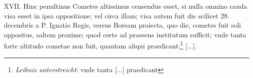 \pend \pstart [p.~184] XVII. Hinc penultinus Cometes\protect{} altissimus censendus esset, si nulla omnino cauda\protect{} visa esset in ipsa oppositione; vel circa illam; visa autem fuit die scilicet 28. decembris a P. Ignatio Regis\protect{}, versus Boream proiecta,  quo die, cometes\protect{} fuit soli oppositus, saltem proxime;  quod certe ad praesens institutum sufficit; vnde tanta forte altitudo cometae\protect{} non fuit, quantam aliqui praedicant;\footnote{\textit{Leibniz unterstreicht}: vnde tanta [...] praedicant} [...].